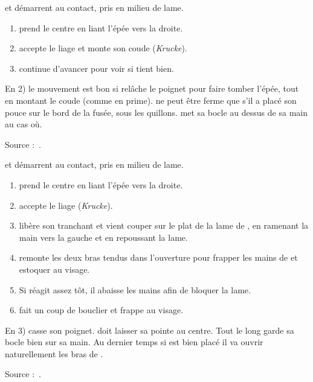 \begin{exercice}
\label{épée-bocle:ex:krucke-liage}

\A et \D démarrent au contact, pris en milieu de lame.

\begin{enumerate}
	\item \A prend le centre en liant l'épée vers la droite.
	\item \D accepte le liage et monte son coude (\emph{Krucke}).
	\item \A continue d'avancer pour voir si \D tient bien.
\end{enumerate}

En 2) le mouvement est bon si \D relâche le poignet pour faire tomber l'épée, tout en montant le coude (comme en prime).
\D ne peut être ferme que s'il a placé son pouce sur le bord de la fusée, sous les quillons.
\D met sa bocle au dessus de sa main au cas où.

Source :~\cite{fuhrmann:dijon:I33_liage:2015}.

\end{exercice}


\begin{technique}

\A et \D démarrent au contact, pris en milieu de lame.

\begin{enumerate}
	\item \A prend le centre en liant l'épée vers la droite.
	\item \D accepte le liage (\emph{Krucke}).
	\item \A libère son tranchant et vient couper sur le plat de la lame de \D, en ramenant la main vers la gauche et en repoussant la lame.
	\item \A remonte les deux bras tendus dans l'ouverture pour frapper les mains de \D et estoquer au visage.
	\item Si \D réagit assez tôt, il abaisse les mains afin de bloquer la lame.
	\item \A fait un coup de bouclier et frappe au visage.
\end{enumerate}

En 3) \A casse son poignet. \A doit laisser sa pointe au centre.
Tout le long \A garde sa bocle bien sur sa main.
Au dernier temps si \A est bien placé il va ouvrir naturellement les bras de \D.

Source :~\cite{fuhrmann:dijon:I33_liage:2015}.

\end{technique}


